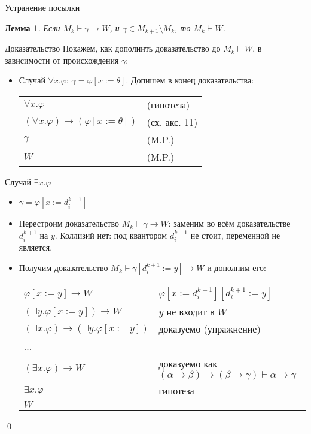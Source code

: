 \documentclass[aspectratio=169]{beamer}
\newtheorem{lmm}{Лемма}[section]
\begin{document}
\begin{frame}{Устранение посылки}
\begin{lmm}
Если $M_k\vdash\gamma\to W$, и $\gamma\in M_{k+1}\setminus M_k$, то $M_k\vdash W$.
\end{lmm}
\begin{block}{Доказательство}
Покажем, как дополнить доказательство до $M_k\vdash W$, в зависимости от происхождения $\gamma$:
\pause

\begin{itemize}
\item Случай $\forall x.\varphi$: $\gamma = \varphi[x:=\theta]$.
\pause
Допишем в конец доказательства:

\begin{tabular}{ll}
$\forall x.\varphi$ & (гипотеза)\\\pause
$(\forall x.\varphi)\to(\varphi[x:=\theta])$ & (сх. акс. 11)\\\pause
$\gamma$  & (M.P.) \\\pause
$W$ & (M.P.)
\end{tabular}
\end{itemize}
\end{block}
\end{frame}

\begin{frame}{Случай $\exists x.\varphi$}
\begin{itemize}\item $\gamma = \varphi[x := d^{k+1}_i]$\pause


\item Перестроим доказательство $M_k\vdash \gamma\to W$:
заменим во всём доказательстве $d^{k+1}_i$ на $y$.
Коллизий нет: под квантором $d^{k+1}_i$ не стоит, переменной не является. \pause
\item Получим доказательство $M_k\vdash \gamma[d^{k+1}_i := y]\to W$ и дополним его:

\begin{tabular}{ll}
$\varphi[x := y]\to W$ & $\varphi[x := d^{k+1}_i][d^{k+1}_i := y]$\\\pause
$(\exists y.\varphi[x:=y])\to W$ & $y$ не входит в $W$ \\\pause
$(\exists x.\varphi)\to(\exists y.\varphi[x:=y])$ & доказуемо (упражнение)\\\pause
 ... \\
$(\exists x.\varphi)\to W$ & доказуемо как $(\alpha\to\beta)\to(\beta\to\gamma)\vdash\alpha\to\gamma$ \\\pause
$\exists x.\varphi$ & гипотеза\\\pause
$W$
\end{tabular}
\end{itemize}
\qed
\end{frame}
\end{document}
